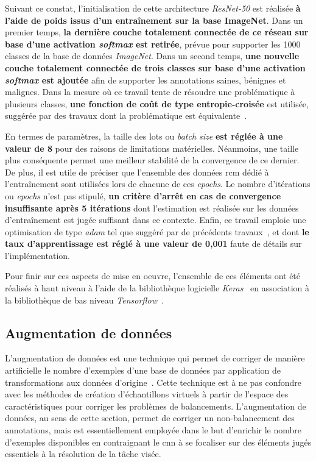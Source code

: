 Suivant ce constat, l'initialisation de cette architecture \textit{ResNet-50} est réalisée \textbf{à l'aide de poids issus d'un entraînement sur la base ImageNet}. Dans un premier temps, \textbf{la dernière couche totalement connectée de ce réseau sur base d'une activation \textit{softmax} est retirée}, prévue pour supporter les 1000 classes de la base de données \textit{ImageNet}. Dans un second temps, \textbf{une nouvelle couche totalement connectée de trois classes sur base d'une activation \textit{softmax} est ajoutée} afin de supporter les annotations saines, bénignes et malignes. Dans la mesure où ce travail tente de résoudre une problématique à plusieurs classes, \textbf{une fonction de coût de type entropie-croisée} est utilisée, suggérée par des travaux dont la problématique est équivalente~\cite{Barbu2018,Park2019}.\par

En termes de paramètres, la taille des lots ou \textit{batch size} \textbf{est réglée à une valeur de 8} pour des raisons de limitations matérielles. Néanmoins, une taille plus conséquente permet une meilleur stabilité de la convergence de ce dernier. De plus, il est utile de préciser que l'ensemble des données \gls{rcm} dédié à l'entraînement sont utilisées lors de chacune de ces \textit{epochs}. Le nombre d'itérations ou \textit{epochs} n'est pas stipulé, \textbf{un critère d'arrêt en cas de convergence insuffisante après 5 itérations} dont l'estimation est réalisée sur les données d'entraînement est jugée suffisant dans ce contexte. Enfin, ce travail emploie une optimisation de type \textit{adam} tel que suggéré par de précédents travaux~\cite{Barbu2018,Park2019}, et dont \textbf{le taux d'apprentissage est réglé à une valeur de 0,001} faute de détails sur l'implémentation.\par

Pour finir sur ces aspects de mise en oeuvre, l'ensemble de ces éléments ont été réalisés à haut niveau à l'aide de la bibliothèque logicielle \textit{Keras}~\cite{chollet2015} en association à la bibliothèque de bas niveau \textit{Tensorflow}~\cite{Tensorflow2016}.\par

\subsection{Augmentation de données}
L'augmentation de données est une technique qui permet de corriger de manière artificielle le nombre d'exemples d'une base de données par application de transformations aux données d'origine~\cite{Wong2016,Taylor2018}. Cette technique est à ne pas confondre avec les méthodes de création d'échantillons virtuels à partir de l'espace des caractéristiques pour corriger les problèmes de balancements. L'augmentation de données, au sens de cette section, permet de corriger un non-balancement des annotations, mais est essentiellement employée dans le but d'enrichir le nombre d'exemples disponibles en contraignant le \gls{cnn} à se focaliser sur des éléments jugés essentiels à la résolution de la tâche visée.\par

